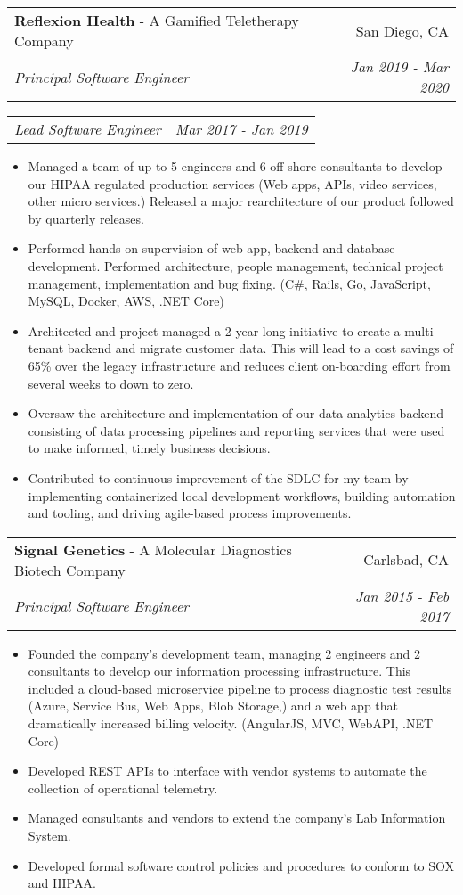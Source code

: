 \documentclass[letterpaper,11pt]{article}
\makeatletter
\newcommand{\resumeItem}[1]{
  \item\footnotesize{
    {#1 \vspace{-2pt}}
  }
}
\newcommand{\resumeSubheadingJobPosition}[5]{
  \vspace{-1pt}\item
    \begin{tabular*}{0.97\textwidth}[t]{l@{\extracolsep{\fill}}r}
      \textbf{#1} - #5 & #2 \\
      \textit{\small#3} & \textit{\small #4} \\
    \end{tabular*}\vspace{-5pt}
}
\newcommand{\resumeSubSubheading}[2]{
    \begin{tabular*}{0.97\textwidth}{l@{\extracolsep{\fill}}r}
      \textit{\small#1} & \textit{\small #2} \\
    \end{tabular*}\vspace{-5pt}
}
\newcommand{\resumeItemListStart}{\begin{itemize}}
\newcommand{\resumeItemListEnd}{\end{itemize}\vspace{-5pt}}
\makeatother
\begin{document}
    \resumeSubheadingJobPosition
        {Reflexion Health}{San Diego, CA}
        {Principal Software Engineer}{Jan 2019 - Mar 2020}
        {A Gamified Teletherapy Company}
        \resumeSubSubheading
        {Lead Software Engineer}{Mar 2017 - Jan 2019}
        \resumeItemListStart
            \resumeItem{
                Managed a team of up to 5 engineers and 6 off-shore consultants to develop our HIPAA regulated production services 
                (Web apps, APIs, video services, other micro services.) Released a major rearchitecture of our product 
                followed by quarterly releases.
            }
            \resumeItem{
                Performed hands-on supervision of web app, backend and database development. Performed architecture, 
                people management, technical project management, implementation and bug fixing. (C\#, Rails, Go, JavaScript, MySQL, Docker, AWS, .NET Core)  
            }
            \resumeItem{
                Architected and project managed a 2-year long initiative to create a multi-tenant backend and migrate customer data. This 
                will lead to a cost savings of 65\% over the legacy infrastructure and reduces client
                on-boarding effort from several weeks to down to zero.
            }
             \resumeItem{
                Oversaw the architecture and implementation of our data-analytics backend consisting of data processing pipelines and 
                reporting services that were used to make informed, timely business decisions.
            }
            \resumeItem{
                Contributed to continuous improvement of the SDLC for my team by implementing containerized local development workflows, building automation and tooling, and 
                driving agile-based process improvements.
            }
        \resumeItemListEnd
            
      
    \resumeSubheadingJobPosition
        {Signal Genetics}{Carlsbad, CA}
        {Principal Software Engineer}{Jan 2015 - Feb 2017}
        {A Molecular Diagnostics Biotech Company}
        \resumeItemListStart
            
            \resumeItem{                
                Founded the company's development team, managing 2 engineers and 2 consultants to develop our information
                processing infrastructure. This included a cloud-based microservice pipeline to process diagnostic test results 
                (Azure, Service Bus, Web Apps, Blob Storage,) and a web app that dramatically increased billing velocity. 
                (AngularJS, MVC, WebAPI, .NET Core)
            }
            \resumeItem{
                Developed REST APIs to interface with vendor systems to automate the collection of operational telemetry.
            }                       
            \resumeItem{
                Managed consultants and vendors to extend the company's Lab Information System.
            }            
            \resumeItem{
                Developed formal software control policies and procedures to conform to SOX and HIPAA.
            }
        \resumeItemListEnd
\end{document}
